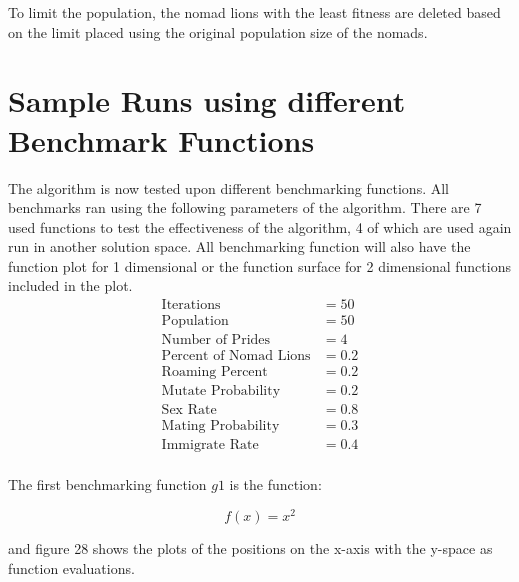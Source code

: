 \par To limit the population, the nomad lions with the least fitness are deleted based on the limit placed using the original population size of the nomads.

\section{Sample Runs using different Benchmark Functions}
\par The algorithm is now tested upon different benchmarking functions. All benchmarks ran using the following parameters of the algorithm. There are 7 used functions to test the effectiveness of the algorithm, 4 of which are used again run in another solution space. All benchmarking function will also have the function plot for 1 dimensional or the function surface for 2 dimensional functions included in the plot.
\begin{align*}
\text{Iterations} &= 50\\
\text{Population} &= 50\\
\text{Number of Prides} &= 4\\
\text{Percent of Nomad Lions} &= 0.2\\
\text{Roaming Percent} &= 0.2\\
\text{Mutate Probability} &= 0.2\\
\text{Sex Rate} &= 0.8\\
\text{Mating Probability} &= 0.3\\
\text{Immigrate Rate} &= 0.4\\
\end{align*}
\par The first benchmarking function $g1$ is the function:

$$
  f(x) = x^2
$$

and figure 28 shows the plots of the positions on the x-axis with the y-space as function evaluations.

